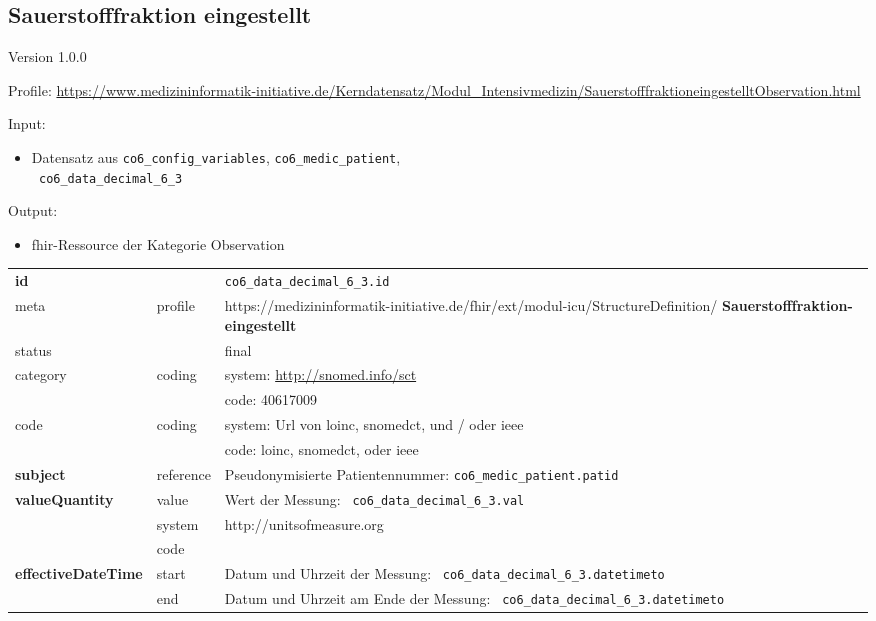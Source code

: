 \subsection{Sauerstofffraktion eingestellt} 
\noindent Version 1.0.0

\noindent Profile: \url{https://www.medizininformatik-initiative.de/Kerndatensatz/Modul_Intensivmedizin/SauerstofffraktioneingestelltObservation.html}

\noindent Input:
\begin{itemize}
	\item Datensatz aus \texttt{co6\_config\_variables}, \texttt{co6\_medic\_patient}, \\ \texttt{
co6\_data\_decimal\_6\_3}
\end{itemize}
Output:
\begin{itemize}
        \item \ac{fhir}-Ressource der Kategorie \glqq Observation\grqq{}
\end{itemize}
\begin{longtable}{|l|l|p{7.5cm}|}
        \hline
        \rowcolor{lightgray} \multicolumn{3}{|l|}{Data Mapping (inhaltlich)} \\ \hline
        \textbf{id} &  & \texttt{co6\_data\_decimal\_6\_3.id} \\ \hline
	meta & profile & https://medizininformatik-initiative.de/fhir/ext/modul-icu/StructureDefinition/\textbf{
Sauerstofffraktion-eingestellt} \\ \hline 
	status &  & final   \\ \hline 
	category & coding & system: \url{http://snomed.info/sct} \\
\cline{3-3}
	& & code: 40617009 \\ \hline
	code & coding & system: Url von \ac{loinc}, \ac{snomedct}, und / oder \ac{ieee} \\ 
	\cline{3-3} 
	 &  & code: \ac{loinc}, \ac{snomedct}, oder \ac{ieee} \\ \hline
	 \textbf{subject}  & reference & Pseudonymisierte Patientennummer: \texttt{co6\_medic\_patient.patid} \\ \hline
	 \textbf{valueQuantity}  & value & Wert der Messung: \texttt{
co6\_data\_decimal\_6\_3.val} \\
        \cline{2-3}
         & system & http://unitsofmeasure.org \\
         \cline{2-3}
         & code & \\ \hline
     \textbf{effectiveDateTime}  & start & Datum und Uhrzeit der Messung: \texttt{
co6\_data\_decimal\_6\_3.datetimeto} \\
    \cline{2-3}
     & end & Datum und Uhrzeit am Ende der Messung: \texttt{
co6\_data\_decimal\_6\_3.datetimeto} \\ \hline
\end{longtable}


